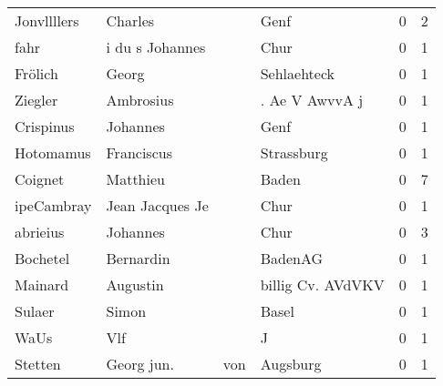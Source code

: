 \begin{tabular}{llllrr}
              Jonvllllers &                            Charles &             &                                        Genf &          0 &         2 \\
                     fahr &                    i du s Johannes &             &                                        Chur &          0 &         1 \\
                  Frölich &                              Georg &             &                                 Sehlaehteck &          0 &         1 \\
                  Ziegler &                          Ambrosius &             &                              . Ae V AwvvA j &          0 &         1 \\
                Crispinus &                           Johannes &             &                                        Genf &          0 &         1 \\
                Hotomamus &                         Franciscus &             &                                  Strassburg &          0 &         1 \\
                  Coignet &                           Matthieu &             &                                       Baden &          0 &         7 \\
               ipeCambray &                    Jean Jacques Je &             &                                        Chur &          0 &         1 \\
                 abrieius &                           Johannes &             &                                        Chur &          0 &         3 \\
                 Bochetel &                          Bernardin &             &                                     BadenAG &          0 &         1 \\
                  Mainard &                           Augustin &             &                           billig Cv. AVdVKV &          0 &         1 \\
                   Sulaer &                              Simon &             &                                       Basel &          0 &         1 \\
                     WaUs &                                Vlf &             &                                           J &          0 &         1 \\
                  Stetten &                        Georg  jun. &         von &                                    Augsburg &          0 &         1 \\

\end{tabular}
